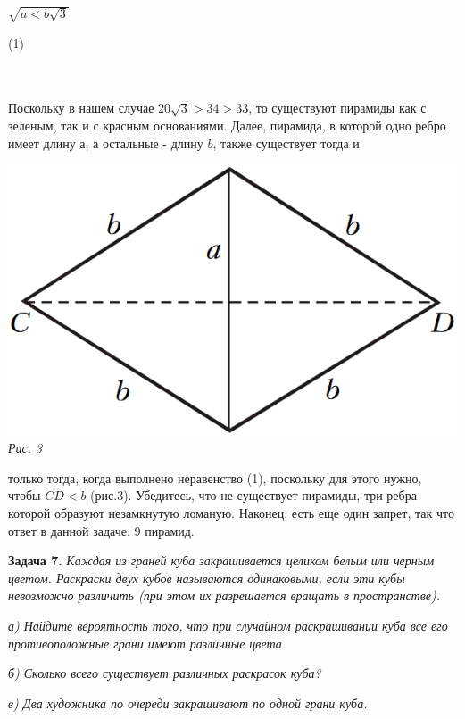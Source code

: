 {\begin{multicols}{3}
\begin{minipage}[b]{0.16666\textwidth}
\raggedleft
$\sqrt{a < b\sqrt{3}}$
\end{minipage}%
\begin{minipage}[b]{0.12\textwidth}
\raggedleft
(1)
\end{minipage}%
\\ \\
Поскольку в нашем случае $20\sqrt{3} > 34 > 33$, то существуют пирамиды как
с зеленым, так и с красным
\vfill\null
\columnbreak
основаниями. Далее, пирамида, в которой одно ребро имеет длину $а$, а остальные -
длину $b$, также существует тогда и
\begin{minipage}{\linewidth}
\includegraphics[width=\linewidth]{images/picture3.png} \\
\textsl{Рис. 3} \\
\end{minipage}
только тогда, когда выполнено неравенство (1),
поскольку для этого нужно, чтобы
$CD < b$
(рис.3). Убедитесь, что не существует пирамиды, три ребра
которой образуют незамкнутую ломаную. Наконец, есть еще один запрет,
так что ответ в данной задаче: 9 пирамид.\par
\textbf{Задача 7.} \textsl{Каждая из граней куба закрашивается целиком
белым или черным цветом. Раскраски двух кубов называются одинаковыми,
если эти кубы невозможно различить (при этом их разрешается
вращать в пространстве).} \par
\textsl{а) Найдите вероятность того, что при случайном раскрашивании куба все
его противоположные грани имеют различные цвета.} \par
\textsl{б) Сколько всего существует различных раскрасок куба?} \par
\textsl{в) Два художника по очереди закрашивают по одной грани куба.
}
\end{multicols}}
